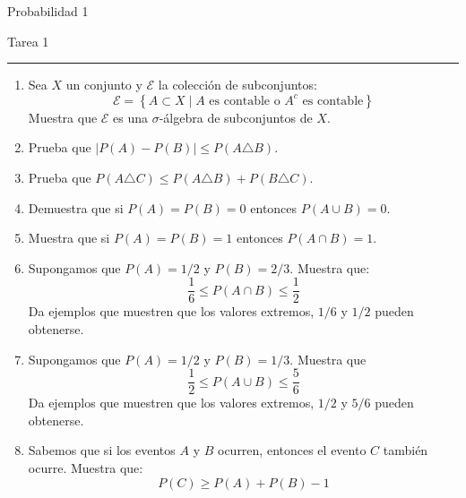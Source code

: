 \documentclass[12pt]{extreport}
\begin{document}
\begin{center}
    \textsf{\Large Probabilidad 1}
    \par\medskip
    \textsf{\large Tarea 1}
    \end{center}
    \hrule
    \par\bigskip

\begin{enumerate}
    \item Sea $X$ un conjunto y $\mathcal{E}$ la colección de subconjuntos:
    $$
    \mathcal{E} = \left\{A\subset X \mid A \text{ es contable o } A^c \text{ es contable}  \right\}
    $$
    Muestra que $\mathcal{E}$ es una $\sigma$-álgebra de subconjuntos de $X$.
    \item Prueba que $\left|P(A)-P(B)\right|\leq P(A\triangle B)$.
    \item Prueba que $P(A\triangle C)\leq P(A\triangle B) + P(B\triangle C)$.
    \item Demuestra que si $P(A) = P(B) = 0 $ entonces $P(A\cup B) = 0$.
    \item Muestra que si $P(A) = P(B) = 1$ entonces $P(A\cap B) = 1$.
    \item Supongamos que $P(A)= 1/2$ y $P(B)= 2/3$. Muestra que:
    $$
    \frac{1}{6} \leq P(A\cap B) \leq \frac{1}{2}
    $$
    Da ejemplos que muestren que los valores extremos, $1/6$ y $1/2$ pueden obtenerse.
    \item Supongamos que $P(A) = 1/2$ y $P(B) = 1/3$. Muestra que
    $$
    \frac{1}{2}\leq P(A\cup B)\leq \frac{5}{6}
    $$
    Da ejemplos que muestren que los valores extremos, $1/2$ y $5/6$ pueden obtenerse.

    \item Sabemos que si los eventos $A$ y $B$ ocurren, entonces el evento $C$ también ocurre. Muestra que:
    $$
    P(C) \geq P(A) + P(B) - 1
    $$ 
\end{enumerate}
\end{document}
